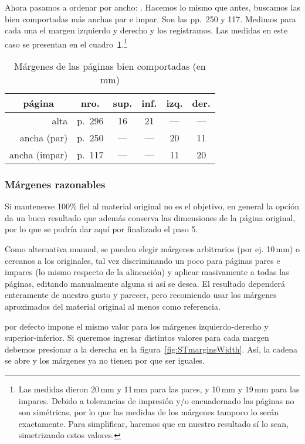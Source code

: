 \documentclass[%
	a5paper,
	10pt,
	twoside,
	openright,
	final,
]{memoir}
\begin{document}
	Ahora pasamos a ordenar por ancho: . Hacemos lo mismo que antes, buscamos las bien comportadas más anchas par e impar. Son las pp.~250 y 117. Medimos para cada una el margen izquierdo y derecho y los registramos. Las medidas en este caso se presentan en el cuadro~\ref{tab:pageMargins}.\footnote{Las medidas dieron 20\,mm y 11\,mm para las pares, y 10\,mm y 19\,mm para las impares. Debido a tolerancias de impresión y/o encuadernado las páginas no son simétricas, por lo que las medidas de los márgenes tampoco lo serán exactamente. Para simplificar, haremos que en nuestro resultado sí lo sean, simetrizando estos valores.}

	\begin{table}
		\centering
		\begin{tabular}{@{}rlcccc@{}}
			\toprule
			\multicolumn{1}{c}{página} & \multicolumn{1}{c}{nro.} & sup. & inf. & izq. & der. \\
			\midrule
			alta & p.~296 & 16 & 21 & --- & --- \\
			ancha (par) & p.~250 & --- & --- & 20 & 11 \\
			ancha (impar) & p.~117 & --- & --- & 11 & 20 \\
			\bottomrule
		\end{tabular}
		\caption{Márgenes de las páginas bien comportadas (en mm)\label{tab:pageMargins}}
	\end{table}

	\subsubsection{Márgenes razonables\label{sec:STmarginsReasonables}} Si mantenerse 100\% fiel al material original no es el objetivo, en general la opción  da un buen resultado que además conserva las dimensiones de la página original, por lo que se podría dar aquí por finalizado el paso 5.

	Como alternativa manual, se pueden elegir márgenes arbitrarios (por ej. 10\,mm) o cercanos a los originales, tal vez discriminando un poco para páginas pares e impares (lo mismo respecto de la alineación) y aplicar masivamente a todas las páginas, editando manualmente alguna si así se desea. El resultado dependerá enteramente de nuestro gusto y parecer, pero recomiendo usar los márgenes aproximados del material original al menos como referencia.

	\scantailor por defecto impone el mismo valor para los márgenes izquierdo-derecho y superior-inferior. Si queremos ingresar distintos valores para cada margen debemos presionar \keys{\faLink} a la derecha en la figura~\ref{fig:STmarginsWidth}. Así, la cadena se abre \keys{\faUnlink} y los márgenes ya no tienen por que ser iguales.
\end{document}
